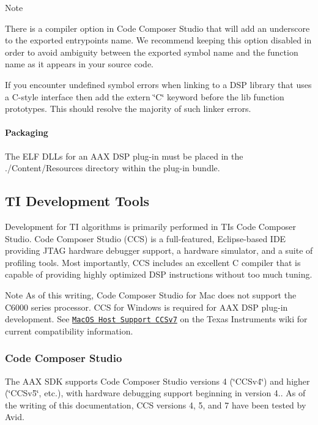 \begin{DoxyNote}{Note}

\begin{DoxyItemize}
\item There is a compiler option in Code Composer Studio that will add an underscore to the exported entrypoint\textquotesingle{}s name. We recommend keeping this option disabled in order to avoid ambiguity between the exported symbol name and the function name as it appears in your source code.  
\item If you encounter undefined symbol errors when linking to a D\+S\+P library that uses a C-\/style interface then add the extern \char`\"{}\+C\char`\"{} keyword before the lib function prototypes. This should resolve the majority of such linker errors. 
\end{DoxyItemize}
\end{DoxyNote}
\hypertarget{a00362_subsubsection__packaging_}{}\paragraph{Packaging}\label{a00362_subsubsection__packaging_}
 The E\+L\+F D\+L\+Ls for an A\+A\+X D\+S\+P plug-\/in must be placed in the ./\+Content/\+Resources directory within the plug-\/in bundle. 

 \hypertarget{a00362_aax_ti_guide_04_ti_development_tools}{}\subsection{T\+I Development Tools}\label{a00362_aax_ti_guide_04_ti_development_tools}
Development for T\+I algorithms is primarily performed in T\+I\textquotesingle{}s Code Composer Studio. Code Composer Studio (C\+C\+S) is a full-\/featured, Eclipse-\/based I\+D\+E providing J\+T\+A\+G hardware debugger support, a hardware simulator, and a suite of profiling tools. Most importantly, C\+C\+S includes an excellent C compiler that is capable of providing highly optimized D\+S\+P instructions without too much tuning.

 \begin{DoxyNote}{Note}
As of this writing, Code Composer Studio for Mac does not support the C6000 series processor. C\+C\+S for Windows is required for A\+A\+X D\+S\+P plug-\/in development. See \href{http://processors.wiki.ti.com/index.php/MacOS_Host_Support_CCSv7}{\tt Mac\+O\+S Host Support C\+C\+Sv7} on the Texas Instruments wiki for current compatibility information.
\end{DoxyNote}
\hypertarget{a00362_subsection__code_composer_studio}{}\subsubsection{Code Composer Studio}\label{a00362_subsection__code_composer_studio}
The A\+A\+X S\+D\+K supports Code Composer Studio versions 4 (\char`\"{}\+C\+C\+Sv4\char`\"{}) and higher (\char`\"{}\+C\+C\+Sv5\char`\"{}, etc.), with hardware debugging support beginning in version 4.. As of the writing of this documentation, C\+C\+S versions 4, 5, and 7 have been tested by Avid.

